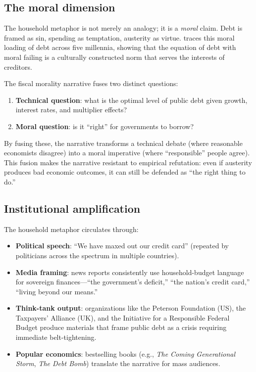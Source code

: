 \subsection{The moral dimension}

The household metaphor is not merely an analogy; it is a \emph{moral} claim.
Debt is framed as sin, spending as temptation, austerity as virtue.
\textcite{graeber2011} traces this moral loading of debt across five millennia, showing that the equation of debt with moral failing is a culturally constructed norm that serves the interests of creditors.

\begin{proposition}
\label{prop:debt-morality}
The fiscal morality narrative fuses two distinct questions:
\begin{enumerate}[nosep]
  \item \textbf{Technical question}: what is the optimal level of public debt given growth, interest rates, and multiplier effects?
  \item \textbf{Moral question}: is it ``right'' for governments to borrow?
\end{enumerate}
By fusing these, the narrative transforms a technical debate (where reasonable economists disagree) into a moral imperative (where ``responsible'' people agree).
This fusion makes the narrative resistant to empirical refutation: even if austerity produces bad economic outcomes, it can still be defended as ``the right thing to do.''
\end{proposition}

\subsection{Institutional amplification}

The household metaphor circulates through:
\begin{itemize}[nosep]
  \item \textbf{Political speech}: ``We have maxed out our credit card'' (repeated by politicians across the spectrum in multiple countries).
  \item \textbf{Media framing}: news reports consistently use household-budget language for sovereign finances---``the government's deficit,'' ``the nation's credit card,'' ``living beyond our means.''
  \item \textbf{Think-tank output}: organizations like the Peterson Foundation (US), the Taxpayers' Alliance (UK), and the Initiative for a Responsible Federal Budget produce materials that frame public debt as a crisis requiring immediate belt-tightening.
  \item \textbf{Popular economics}: bestselling books (e.g., \emph{The Coming Generational Storm}, \emph{The Debt Bomb}) translate the narrative for mass audiences.
\end{itemize}

